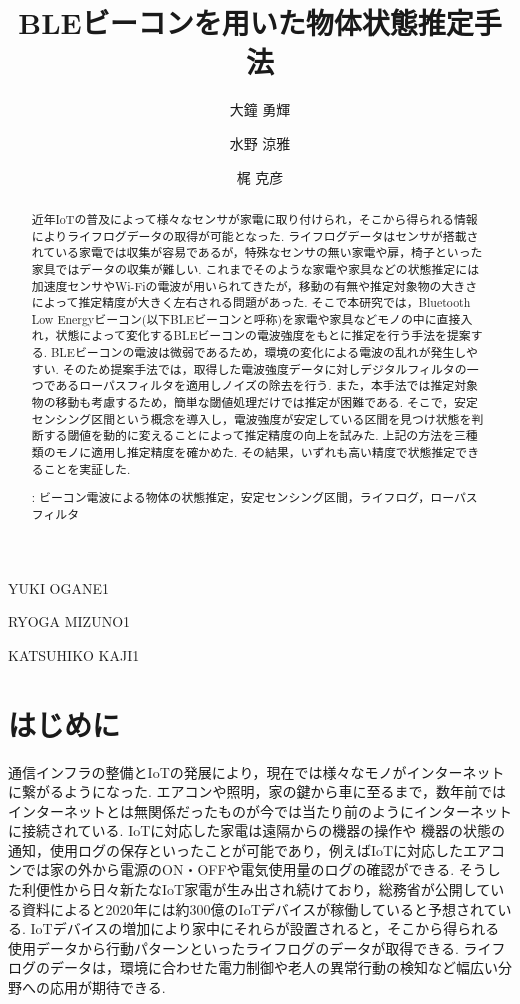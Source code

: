 \documentclass[Japanese]{dicomopapers}
\begin{document}
\title{BLEビーコンを用いた物体状態推定手法}


\author{大鐘 勇輝}{YUKI OGANE}{1}
\author{水野 涼雅}{RYOGA MIZUNO}{1}
\author{梶 克彦}{KATSUHIKO KAJI}{1}




\begin{abstract}
近年IoTの普及によって様々なセンサが家電に取り付けられ，そこから得られる情報によりライフログデータの取得が可能となった.
ライフログデータはセンサが搭載されている家電では収集が容易であるが，特殊なセンサの無い家電や扉，椅子といった家具ではデータの収集が難しい.
これまでそのような家電や家具などの状態推定には加速度センサやWi-Fiの電波が用いられてきたが，移動の有無や推定対象物の大きさによって推定精度が大きく左右される問題があった.
そこで本研究では，Bluetooth Low Energyビーコン(以下BLEビーコンと呼称)を家電や家具などモノの中に直接入れ，状態によって変化するBLEビーコンの電波強度をもとに推定を行う手法を提案する.
BLEビーコンの電波は微弱であるため，環境の変化による電波の乱れが発生しやすい.
そのため提案手法では，取得した電波強度データに対しデジタルフィルタの一つであるローパスフィルタを適用しノイズの除去を行う.
また，本手法では推定対象物の移動も考慮するため，簡単な閾値処理だけでは推定が困難である.
そこで，安定センシング区間という概念を導入し，電波強度が安定している区間を見つけ状態を判断する閾値を動的に変えることによって推定精度の向上を試みた.
上記の方法を三種類のモノに適用し推定精度を確かめた.
その結果，いずれも高い精度で状態推定できることを実証した.

 : ビーコン電波による物体の状態推定，安定センシング区間，ライフログ，ローパスフィルタ



\end{abstract}

\maketitle

\section{はじめに}
通信インフラの整備とIoTの発展により，現在では様々なモノがインターネットに繋がるようになった.
エアコンや照明，家の鍵から車に至るまで，数年前ではインターネットとは無関係だったものが今では当たり前のようにインターネットに接続されている.
IoTに対応した家電は遠隔からの機器の操作や 機器の状態の通知，使用ログの保存といったことが可能であり，例えばIoTに対応したエアコンでは家の外から電源のON・OFFや電気使用量のログの確認ができる.
そうした利便性から日々新たなIoT家電が生み出され続けており，総務省が公開している資料\cite{soumusyo}によると2020年には約300億のIoTデバイスが稼働していると予想されている.
IoTデバイスの増加により家中にそれらが設置されると，そこから得られる使用データから行動パターンといったライフログのデータが取得できる.
ライフログのデータは，環境に合わせた電力制御や老人の異常行動の検知など幅広い分野への応用が期待できる.
\end{document}
